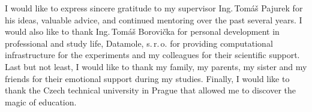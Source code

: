 I would like to express sincere gratitude to my supervisor Ing.\,Tomáš Pajurek for his ideas, valuable advice, and continued mentoring over the past several years. I would also like to thank Ing.\,Tomáš Borovička for personal development in professional and study life, Datamole, s.\,r.\,o. for providing computational infrastructure for the experiments and my colleagues for their scientific support. Last but not least, I would like to thank my family, my parents, my sister and my friends for their emotional support during my studies. Finally, I would like to thank the Czech technical university in Prague that allowed me to discover the magic of education.
